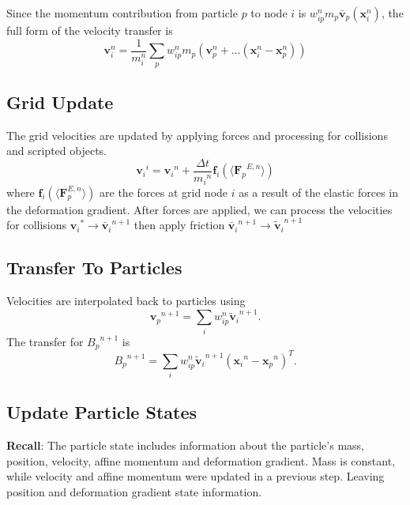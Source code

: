 \documentclass{scrartcl}
\theoremstyle{definition}
\begin{document}
Since the momentum contribution from particle $p$ to node $i$ is $w_{ip}^nm_p\bar{\textbf{v}}_p(\textbf{x}_i^n)$, the full form of the velocity transfer is
\begin{equation*}
\textbf{v}_i^n = \frac{1}{m_i^n}\sum_p{w_{ip}^nm_p(\textbf{v}_p^n+\ldots(\textbf{x}_i^n-\textbf{x}_p^n))}
\end{equation*}

\subsection{Grid Update}
The grid velocities are updated by applying forces and processing for collisions and scripted objects.
\begin{equation*}
{\textbf{v}_i}^i = {\textbf{v}_i}^n+\frac{\Delta t}{{m_i}^n}\textbf{f}_i(\langle {\textbf{F}_p}^{E,n}\rangle)
\end{equation*}
where $\textbf{f}_i(\langle\textbf{F}_p^{E,n}\rangle)$ are the forces at grid node $i$ as a result of the elastic forces in the deformation gradient. After forces are applied, we can process the velocities for collisions ${\textbf{v}_i}^*\rightarrow {\bar{\textbf{v}}_{i}}^{n+1}$ then apply friction ${\bar{\textbf{v}}_{i}}^{n+1} \rightarrow {\tilde{\textbf{v}}_{i}}^{n+1}$

\subsection{Transfer To Particles}
Velocities are interpolated back to particles using
\begin{equation*}
{\textbf{v}_p}^{n+1} = \sum_i{{w_{ip}^n{\tilde{\textbf{v}}_{i}}^{n+1}}}.
\end{equation*}
The transfer for ${B_p}^{n+1}$ is
\begin{equation*}
{B_p}^{n+1}=\sum_i{w_{ip}^n{\tilde{\textbf{v}}_i}^{n+1}({\textbf{x}_i}^n-{\textbf{x}_p}^n)^T}.
\end{equation*}

\subsection{Update Particle States}
\textbf{Recall}: The particle state includes information about the particle's mass, position, velocity, affine momentum and deformation gradient. Mass is constant, while velocity and affine momentum were updated in a previous step. Leaving position and deformation gradient state information.
\end{document}
